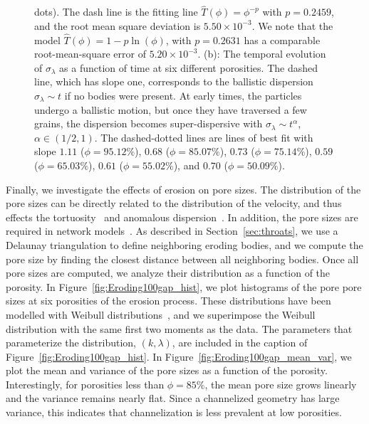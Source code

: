 \documentclass[preprint,10pt]{elsarticle}
\begin{document}
\begin{figure}[H]
{dots).  The dash line is the fitting line $\widehat{T}(\phi)=\phi^{-p}$
with $p=0.2459$, and the root mean square deviation is $5.50 \times
10^{-3}$.  We note that the model $\widehat{T}(\phi) = 1 - p \ln
(\phi)$, with $p=0.2631$ has a comparable root-mean-square error of
$5.20 \times 10^{-3}$.  (b): The temporal evolution of $\sigma_\lambda$
as a function of time at six different porosities.  The dashed line,
which has slope one, corresponds to the ballistic dispersion
$\sigma_\lambda \sim t$ if no bodies were present.  At early times, the
particles undergo a ballistic motion, but once they have traversed a few
grains, the dispersion becomes super-dispersive with $\sigma_\lambda
\sim t^{\alpha}$, $\alpha \in (1/2,1)$.  The dashed-dotted lines are
lines of best fit with slope $1.11$ ($\phi=95.12\%$), $0.68$
($\phi=85.07\%$), $0.73$ ($\phi=75.14\%$), $0.59$ ($\phi=65.03\%$),
$0.61$ ($\phi=55.02\%$), and $0.70$ ($\phi=50.09\%$).}
\end{figure}


Finally, we investigate the effects of erosion on pore sizes.  The
distribution of the pore sizes can be directly related to the
distribution of the velocity, and thus effects the
tortuosity~\cite{den-ica-hid2018} and anomalous
dispersion~\cite{dea-qua-bir-jua2018}. In addition, the pore sizes are
required in network models~\cite{bry-mel-cad1993, bry-kin-mel1993}.  As
described in Section~\ref{sec:throats}, we use a Delaunay triangulation
to define neighboring eroding bodies, and we compute the pore size by
finding the closest distance between all neighboring bodies.  Once all
pore sizes are computed, we analyze their distribution as a function
of the porosity.  In Figure~\ref{fig:Eroding100gap_hist}, we plot
histograms of the pore pore sizes at six porosities of the erosion
process. These distributions have been modelled with Weibull
distributions~\cite{ioa-cha1993}, and we superimpose the Weibull
distribution with the same first two moments as the data.  The
parameters that parameterize the distribution, $(k,\lambda)$, are
included in the caption of Figure~\ref{fig:Eroding100gap_hist}.  In
Figure~\ref{fig:Eroding100gap_mean_var}, we plot the mean and variance
of the pore sizes as a function of the porosity.  Interestingly, for
porosities less than $\phi = 85\%$, the mean pore size grows linearly
and the variance remains nearly flat. Since a channelized geometry has
large variance, this indicates that channelization is less prevalent at
low porosities.
\end{document}
